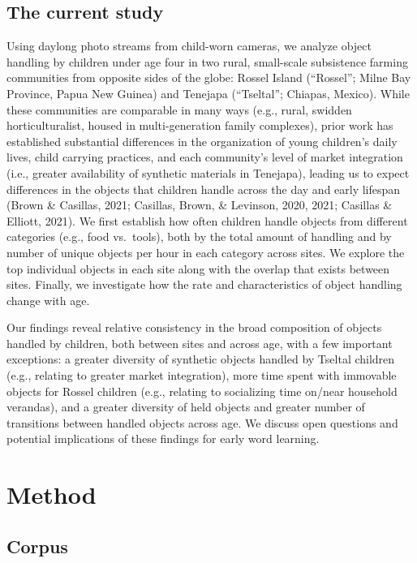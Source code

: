 \documentclass[10pt, letterpaper]{article}
\begin{document}
\hypertarget{the-current-study}{%
\subsection{The current study}\label{the-current-study}}

Using daylong photo streams from child-worn cameras, we analyze object
handling by children under age four in two rural, small-scale
subsistence farming communities from opposite sides of the globe: Rossel
Island (``Rossel''; Milne Bay Province, Papua New Guinea) and Tenejapa
(``Tseltal''; Chiapas, Mexico). While these communities are comparable
in many ways (e.g., rural, swidden horticulturalist, housed in
multi-generation family complexes), prior work has established
substantial differences in the organization of young children's daily
lives, child carrying practices, and each community's level of market
integration (i.e., greater availability of synthetic materials in
Tenejapa), leading us to expect differences in the objects that children
handle across the day and early lifespan (Brown \& Casillas, 2021;
Casillas, Brown, \& Levinson, 2020, 2021; Casillas \& Elliott, 2021). We
first establish how often children handle objects from different
categories (e.g., food vs.~tools), both by the total amount of handling
and by number of unique objects per hour in each category across sites.
We explore the top individual objects in each site along with the
overlap that exists between sites. Finally, we investigate how the rate
and characteristics of object handling change with age.

Our findings reveal relative consistency in the broad composition of
objects handled by children, both between sites and across age, with a
few important exceptions: a greater diversity of synthetic objects
handled by Tseltal children (e.g., relating to greater market
integration), more time spent with immovable objects for Rossel children
(e.g., relating to socializing time on/near household verandas), and a
greater diversity of held objects and greater number of transitions
between handled objects across age. We discuss open questions and
potential implications of these findings for early word learning.

\hypertarget{method}{%
\section{Method}\label{method}}

\hypertarget{corpus}{%
\subsection{Corpus}\label{corpus}}
\end{document}
